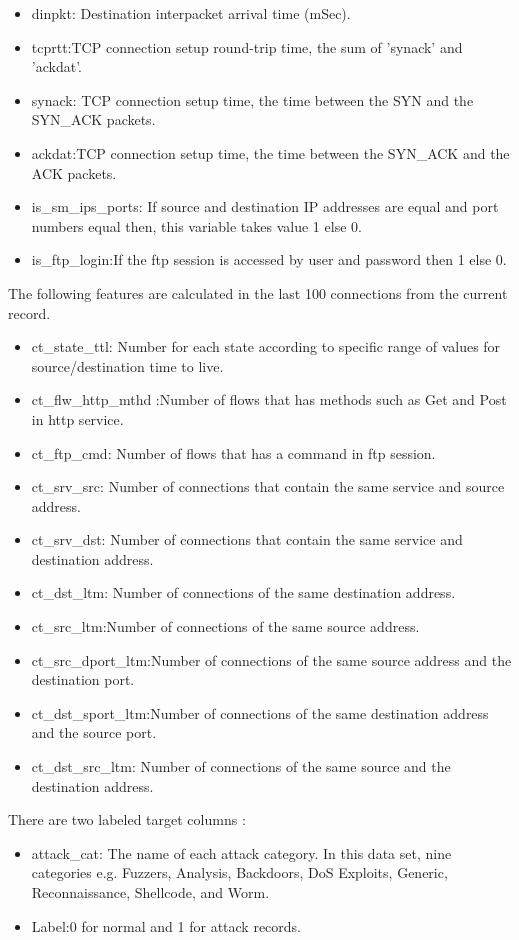 \documentclass[14pt, conference]{IEEEtran}
\begin{document}
\begin{itemize}
\item dinpkt: Destination interpacket arrival time (mSec).
\item tcprtt:TCP connection setup round-trip time, the sum of ’synack’ and ’ackdat’.
\item synack: TCP connection setup time, the time between the SYN and the SYN\_ACK packets.
\item ackdat:TCP connection setup time, the time between the SYN\_ACK and the ACK packets.
\item is\_sm\_ips\_ports: If source and destination IP addresses are equal and port numbers equal then, this variable takes value 1 else 0.
\item is\_ftp\_login:If the ftp session is accessed by user and password then 1 else 0.

\end{itemize}

The following features are calculated in the last 100 connections from the current record.
\begin{itemize} 
\item ct\_state\_ttl: Number for each state according to specific range of values for source/destination time to live.
\item ct\_flw\_http\_mthd :Number of flows that has methods such as Get and Post in http service.

\item ct\_ftp\_cmd: Number of flows that has a command in ftp session.
\item ct\_srv\_src: Number of connections that contain the same service  and source address.
\item ct\_srv\_dst: Number of connections that contain the same service  and destination address.
\item ct\_dst\_ltm: Number of connections of the same destination address.
\item ct\_src\_ltm:Number of connections of the same source address.
\item ct\_src\_dport\_ltm:Number of connections of the same source address and the destination port.
\item ct\_dst\_sport\_ltm:Number of connections of the same destination address and the source port.
\item ct\_dst\_src\_ltm: Number of connections of the same source  and the destination address.
\end{itemize}

There are two labeled target columns :
\begin{itemize} 
    \item attack\_cat: The name of each attack category. In this data set, nine categories e.g. Fuzzers, Analysis, Backdoors, DoS Exploits, Generic, Reconnaissance, Shellcode, and Worm.
 \item Label:0 for normal and 1 for attack records.
\end{itemize}
\end{document}
